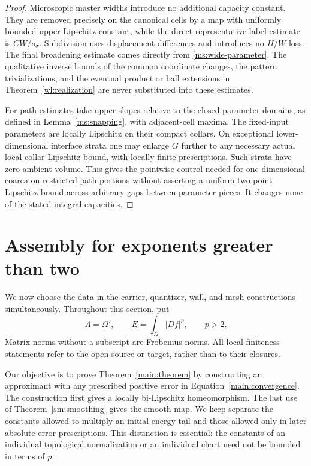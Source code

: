 \documentclass[11pt]{article}
\numberwithin{equation}{section}
\theoremstyle{definition}
\theoremstyle{remark}
\begin{document}
\begin{proof}
Microscopic master widths introduce no additional capacity
constant.  They are removed precisely on the canonical cells
by a map with uniformly bounded upper Lipschitz constant, while
the direct representative-label estimate is $CW/s_\sigma$.
Subdivision uses displacement differences and introduces no
$H/W$ loss.  The final broadening estimate comes directly
from \eqref{ms:wide-parameter}.  The qualitative inverse bounds
of the common coordinate changes, the pattern trivializations,
and the eventual product or ball extensions in
Theorem~\ref{wl:realization} are never substituted into these estimates.

For path estimates take upper slopes relative to the closed
parameter domains, as defined in Lemma~\ref{ms:snapping}, with
adjacent-cell maxima.  The fixed-input parameters are locally
Lipschitz on their compact collars.  On exceptional
lower-dimensional interface strata one may enlarge $G$ further
to any necessary actual local collar Lipschitz bound, with
locally finite prescriptions.  Such strata have zero ambient
volume.  This gives the pointwise control needed for
one-dimensional coarea on restricted path portions without
asserting a uniform two-point Lipschitz bound across arbitrary
gaps between parameter pieces.  It changes none of the stated
integral capacities.
\end{proof}

\section{Assembly for exponents greater than two}
\label{ha:section}\label{sec:high-assembly}

We now choose the data in the carrier, quantizer, wall, and mesh
constructions simultaneously.  Throughout this section, put
\[
 \Lambda=\Omega',\qquad E=\int_\Omega |Df|^p,\qquad p>2.
\]
Matrix norms without a subscript are Frobenius norms.  All local
finiteness statements refer to the open source or target, rather than
to their closures.

Our objective is to prove Theorem~\ref{main:theorem} by constructing
an approximant with any prescribed positive error in
Equation~\eqref{main:convergence}.  The construction first gives a
locally bi-Lipschitz homeomorphism.  The last use of
Theorem~\ref{sm:smoothing} gives the smooth map.
We keep separate the constants allowed to multiply an
initial energy tail and those allowed only in later absolute-error
prescriptions.  This distinction is essential: the constants of an
individual topological normalization or an individual chart need not
be bounded in terms of $p$.
\end{document}
